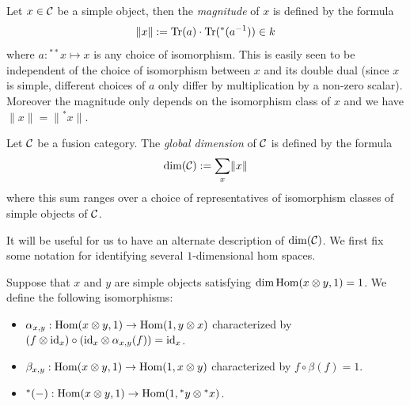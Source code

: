 \documentclass{amsart}
\begin{document}
\begin{definition}
Let $x \in \mathcal C$ be a simple object, then the {\em magnitude}
 of $x$ is defined by the formula 
\begin{equation*}
	\lVert x \rVert := \mathrm{Tr}(a) \cdot \mathrm{Tr}({}^*(a^{-1})) \in k
\end{equation*}
where $a: {}^{**}x \mapsto x$ is any choice of isomorphism.  This is easily seen to be independent of the choice of isomorphism between $x$ and its double dual (since $x$ is simple, different choices of $a$ only differ by multiplication by a non-zero scalar). Moreover the magnitude only depends on the isomorphism class of $x$ and we have $\lVert x \rVert = \lVert {}^*x \rVert$.
\end{definition}

\begin{definition}
	Let $\mathcal C$ be a fusion category. The {\em global dimension} of $\mathcal C$ is defined by the formula
	\begin{equation*}
		\dim(\mathcal C) := \sum_{x} \lVert x \rVert
	\end{equation*}
	where this sum ranges over a choice of representatives of isomorphism classes of simple objects of $\mathcal C$. 
\end{definition}

It will be useful for us to have an alternate description of $\dim(\mathcal C)$.  We first fix some notation for identifying several $1$-dimensional hom spaces.

\begin{definition}
Suppose that $x$ and $y$ are simple objects satisfying $\dim \operatorname{Hom}(x \otimes y, 1) = 1$.  We define the following isomorphisms:
\begin{itemize}
\item $\alpha_{x,y}: \operatorname{Hom}(x \otimes y, 1) \rightarrow \operatorname{Hom}(1, y \otimes x)$ characterized by $(f \otimes \mathrm{id}_x) \circ (\mathrm{id}_x \otimes \alpha_{x,y}(f)) = \mathrm{id}_x$.
\item $\beta_{x,y}: \operatorname{Hom}(x \otimes y, 1) \rightarrow \operatorname{Hom}(1, x \otimes y)$ characterized by $f \circ \beta(f)  = 1$.
\item ${}^*(-): \operatorname{Hom}(x \otimes y, 1) \rightarrow \operatorname{Hom}(1, {}^*y \otimes {}^*x)$.
\end{itemize}
\end{definition}
\end{document}
